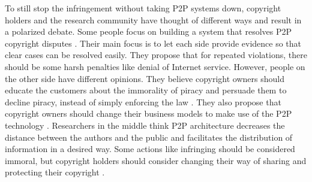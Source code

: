 \documentclass[12pt]{article}
\begin{document}
To still stop the infringement without taking P2P systems down, copyright holders and the research community have thought of different ways and result in a polarized debate. Some people focus on building a system that resolves P2P copyright disputes \cite{14_lemley2005quick}. Their main focus is to let each side provide evidence so that clear cases can be resolved easily. They propose that for repeated violations, there should be some harsh penalties like denial of Internet service. However, people on the other side have different opinions. They believe copyright owners should educate the customers about the immorality of piracy and persuade them to decline piracy, instead of simply enforcing the law \cite{18_article}. They also propose that copyright owners should change their business models to make use of the P2P technology \cite{17_article}. Researchers in the middle think P2P architecture decreases the distance between the authors and the public and facilitates the distribution of information in a desired way. Some actions like infringing should be considered immoral, but copyright holders should consider changing their way of sharing and protecting their copyright \cite{12_10.2307/40863687}. 

\end{document}
